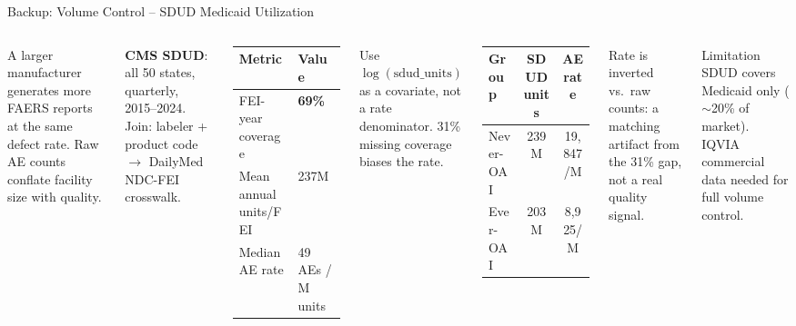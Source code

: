\documentclass[aspectratio=169,10pt]{beamer}
\newcommand{\highlight}[1]{{\color{ncsuRed}\textbf{#1}}}
\begin{document}
\begin{frame}{Backup: Volume Control -- SDUD Medicaid Utilization}
\begin{columns}[T]
A larger manufacturer generates more FAERS reports at the same defect rate. Raw AE counts conflate facility size with quality.

\vspace{6pt}
\textbf{CMS SDUD}: all 50 states, quarterly, 2015--2024. Join: labeler + product code $\to$ DailyMed NDC-FEI crosswalk.

\vspace{6pt}
\begin{tabular}{ll}
\toprule
Metric & Value \\
\midrule
FEI-year coverage & \highlight{69\%} \\
Mean annual units/FEI & 237M \\
Median AE rate & 49 AEs / M units \\
\bottomrule
\end{tabular}

\vspace{6pt}
Use $\log(\text{sdud\_units})$ as a covariate, not a rate denominator. 31\% missing coverage biases the rate.

\begin{tabular}{lcc}
\toprule
Group & SDUD units & AE rate \\
\midrule
Never-OAI & 239M & 19,847/M \\
Ever-OAI  & 203M & 8,925/M \\
\bottomrule
\end{tabular}

\vspace{8pt}
Rate is inverted vs.\ raw counts: a matching artifact from the 31\% gap, not a real quality signal.

\vspace{8pt}
\begin{block}{Limitation}
SDUD covers Medicaid only ($\sim$20\% of market). IQVIA commercial data needed for full volume control.
\end{block}
\end{columns}
\end{frame}
\end{document}
